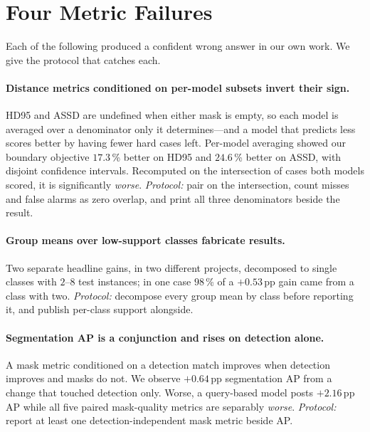 \documentclass[10pt,twocolumn,letterpaper]{article}
\begin{document}
\section{Four Metric Failures}
\label{sec:metrics}

Each of the following produced a confident wrong answer in our own work. We give
the protocol that catches each.

\paragraph{Distance metrics conditioned on per-model subsets invert their sign.}
HD95 and ASSD are undefined when either mask is empty, so each model is averaged
over a denominator only it determines---and a model that predicts less scores
better by having fewer hard cases left. Per-model averaging showed our boundary
objective $17.3$\,\% better on HD95 and $24.6$\,\% better on ASSD, with disjoint
confidence intervals. Recomputed on the intersection of cases both models scored,
it is significantly \emph{worse}. \emph{Protocol:} pair on the intersection,
count misses and false alarms as zero overlap, and print all three denominators
beside the result.

\paragraph{Group means over low-support classes fabricate results.} Two separate
headline gains, in two different projects, decomposed to single classes with
$2$--$8$ test instances; in one case $98$\,\% of a $+0.53$\,pp gain came from a
class with two. \emph{Protocol:} decompose every group mean by class before
reporting it, and publish per-class support alongside.

\paragraph{Segmentation AP is a conjunction and rises on detection alone.} A mask
metric conditioned on a detection match improves when detection improves and masks
do not. We observe $+0.64$\,pp segmentation AP from a change that touched
detection only. Worse, a query-based model posts $+2.16$\,pp AP while all five
paired mask-quality metrics are separably \emph{worse}. \emph{Protocol:} report at
least one detection-independent mask metric beside AP.
\end{document}
